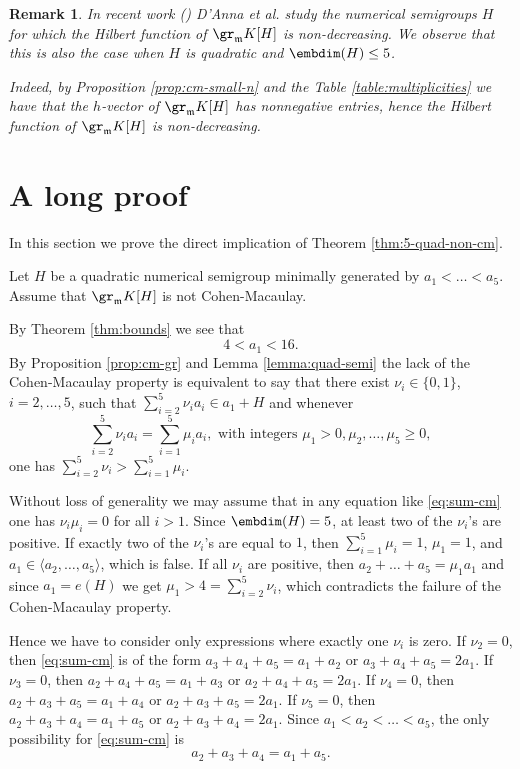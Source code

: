 \documentclass[12pt]{amsart}
\def\frk{\mathfrak}               %
\def\mm{{\frk m}}
\newtheorem{Remark}[Theorem]{Remark}
\begin{document}
\begin{Remark}{\em
In recent work (\cite {dAdMM}) D'Anna et al. study the numerical semigroups $H$ for which the   Hilbert function of $\gr_\mm K[H]$ is non-decreasing.
We observe that this is also the case when  $H$ is quadratic and $\embdim(H) \leq 5$.

Indeed, by Proposition \ref{prop:cm-small-n} and the Table \ref{table:multiplicities} we have that the $h$-vector of $\gr_\mm K[H]$ has nonnegative entries, 
hence  the Hilbert function of $\gr_\mm K[H]$ is non-decreasing.
}
\end{Remark}

\medskip

\section{A long proof}
\label{sec:long}


In this section we prove the direct implication of Theorem \ref{thm:5-quad-non-cm}.

Let $H$ be a quadratic numerical semigroup minimally generated by $a_1<\dots <a_5$. Assume 
that $\gr_\mm K[H]$ is not Cohen-Macaulay. 


By Theorem \ref{thm:bounds} we see that 
\begin{equation}
4<a_1< 16.
\end{equation}
By Proposition \ref{prop:cm-gr} and Lemma \ref{lemma:quad-semi} the lack of the Cohen-Macaulay property is equivalent to say that there exist $\nu_i \in \{0,1\}$, $i=2,\dots, 5$, 
such that $\sum_{i=2}^5 \nu_i a_i \in a_1+H$ and whenever 
\begin{equation}
\label{eq:sum-cm}
\sum_{i=2}^5 \nu_i a_i= \sum_{i=1}^5 \mu_i a_i, \text{ with integers }\mu_1>0, \mu_2, \dots, \mu_5 \geq 0,
\end{equation}
one has $\sum_{i=2}^5 \nu_i > \sum_{i=1}^5 \mu_i$.

Without loss of generality we may assume that in any equation like \eqref{eq:sum-cm} one has $\nu_i \mu_i=0$ for all $i>1$.
Since $\embdim(H)=5$, at least two of the $\nu_i$'s are positive.
If exactly two of the $\nu_i$'s are equal to $1$, then $\sum_{i=1}^5 \mu_i=1$, $\mu_1=1$, and $a_1 \in \langle a_2, \dots, a_5\rangle$, which is false.
If all $\nu_i$ are positive, then $a_2+\dots +a_5=\mu_1 a_1$ and since $a_1=e(H)$ we get $\mu_1 >4=\sum_{i=2}^5 \nu_i$, 
which contradicts the failure of the Cohen-Macaulay property.

Hence we have to consider only expressions where exactly one $\nu_i$ is zero.
If $\nu_2=0$, then \eqref{eq:sum-cm} is of the form $a_3+a_4+ a_5= a_1+a_2$ or $a_3+a_4+ a_5= 2 a_1$. 
If $\nu_3=0$, then   $a_2+a_4+ a_5= a_1+a_3$ or $a_2+a_4+ a_5= 2 a_1$.
If  $\nu_4=0$, then  $a_2+a_3+ a_5= a_1+a_4$ or $a_2+a_3+ a_5= 2 a_1$.
If $\nu_5=0$, then  $a_2+a_3+ a_4= a_1+a_5$ or $a_2+a_3+ a_4= 2 a_1$.
Since   $a_1<a_2<\dots <a_5$,  the only possibility for \eqref{eq:sum-cm} is
\begin{equation}
\label{eq:sum}
a_2+a_3+a_4=  a_1+a_5.
\end{equation}
\end{document}
